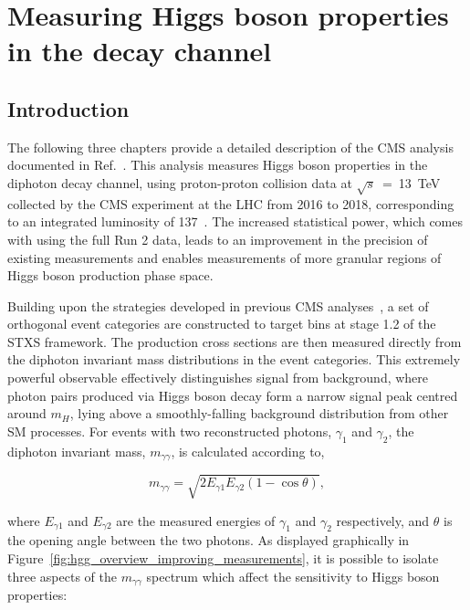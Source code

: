 \chapter{Measuring Higgs boson properties in the \Hgg decay channel}
\label{chap:hgg_overview}

\section{Introduction}\label{sec:hgg_introduction}
The following three chapters provide a detailed description of the CMS \Hgg analysis documented in Ref.~\cite{CMS-PAS-HIG-19-015}. This analysis measures Higgs boson properties in the diphoton decay channel, using proton-proton collision data at $\sqrt{s}$~=~13~TeV collected by the CMS experiment at the LHC from 2016 to 2018, corresponding to an integrated luminosity of 137~\fbinv. The increased statistical power, which comes with using the full Run 2 data, leads to an improvement in the precision of existing measurements and enables measurements of more granular regions of Higgs boson production phase space. 

Building upon the strategies developed in previous CMS \Hgg analyses~\cite{Sirunyan:2018ouh,CMS-PAS-HIG-18-029,Sirunyan:2020sum}, a set of orthogonal event categories are constructed to target bins at stage 1.2 of the STXS framework. The production cross sections are then measured directly from the diphoton invariant mass distributions in the event categories. This extremely powerful observable effectively distinguishes signal from background, where photon pairs produced via Higgs boson decay form a narrow signal peak centred around $m_H$, lying above a smoothly-falling background distribution from other SM processes. For events with two reconstructed photons, $\gamma_1$ and $\gamma_2$, the diphoton invariant mass, $m_{\gamma\gamma}$, is calculated according to,

\begin{equation}\label{eq:mgg}
    m_{\gamma\gamma} = \sqrt{2E_{\gamma1}E_{\gamma2}(1-\cos{\theta})},
\end{equation}

\noindent
where $E_{\gamma1}$ and $E_{\gamma2}$ are the measured energies of $\gamma_1$ and $\gamma_2$ respectively, and $\theta$ is the opening angle between the two photons. As displayed graphically in Figure~\ref{fig:hgg_overview_improving_measurements}, it is possible to isolate three aspects of the $m_{\gamma\gamma}$ spectrum which affect the sensitivity to Higgs boson properties: 

